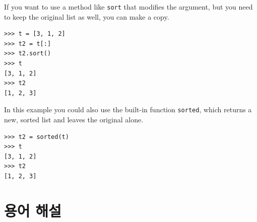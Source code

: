 \documentclass[10pt]{book}
\begin{document}
\begin{enumerate}
If you want to use a method like {\tt sort} that modifies
the argument, but you need to keep the original list as
well, you can make a copy.

\begin{verbatim}
>>> t = [3, 1, 2]
>>> t2 = t[:]
>>> t2.sort()
>>> t
[3, 1, 2]
>>> t2
[1, 2, 3]
\end{verbatim}

In this example you could also use the built-in function {\tt sorted},
which returns a new, sorted list and leaves the original alone.

\begin{verbatim}
>>> t2 = sorted(t)
>>> t
[3, 1, 2]
>>> t2
[1, 2, 3]
\end{verbatim}

\end{enumerate}



\section{용어 해설}
\end{document}
